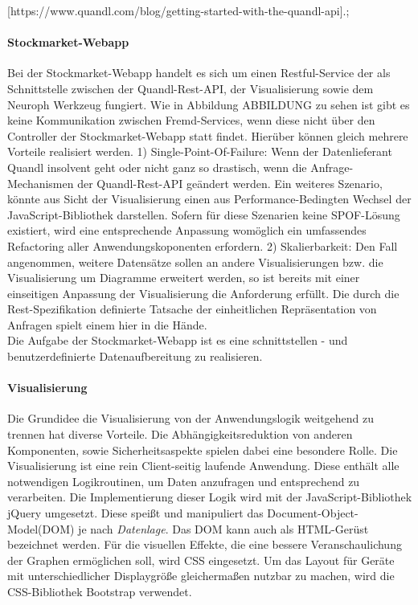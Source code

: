 [https://www.quandl.com/blog/getting-started-with-the-quandl-api].\linebreak;

\paragraph{Stockmarket-Webapp}
Bei der Stockmarket-Webapp handelt es sich um einen Restful-Service der als Schnittstelle zwischen der Quandl-Rest-API, der Visualisierung sowie dem Neuroph Werkzeug fungiert. Wie in Abbildung ABBILDUNG zu sehen ist gibt es keine Kommunikation zwischen Fremd-Services, wenn diese nicht über den Controller der Stockmarket-Webapp statt findet. Hierüber können gleich mehrere Vorteile realisiert werden. 
1) Single-Point-Of-Failure: Wenn der Datenlieferant Quandl insolvent geht oder nicht ganz so drastisch, wenn die Anfrage-Mechanismen der Quandl-Rest-API geändert werden. Ein weiteres Szenario, könnte aus Sicht der Visualisierung einen aus Performance-Bedingten Wechsel der JavaScript-Bibliothek darstellen. Sofern für diese Szenarien keine SPOF-Lösung existiert, wird eine entsprechende Anpassung womöglich ein umfassendes Refactoring aller Anwendungskoponenten erfordern. 
2) Skalierbarkeit: Den Fall angenommen, weitere Datensätze sollen an andere Visualisierungen bzw. die Visualisierung um Diagramme erweitert werden, so ist bereits mit einer einseitigen Anpassung der Visualisierung die Anforderung erfüllt. Die durch die Rest-Spezifikation definierte Tatsache der einheitlichen Repräsentation von Anfragen spielt einem hier in die Hände. \\
Die Aufgabe der Stockmarket-Webapp ist es eine schnittstellen - und benutzerdefinierte Datenaufbereitung zu realisieren. 

\paragraph{Visualisierung}
Die Grundidee die Visualisierung von der Anwendungslogik weitgehend zu trennen hat diverse Vorteile. Die Abhängigkeitsreduktion von anderen Komponenten, sowie Sicherheitsaspekte spielen dabei eine besondere Rolle. 
Die Visualisierung ist eine rein Client-seitig laufende Anwendung. Diese enthält alle notwendigen Logikroutinen, um Daten anzufragen und entsprechend zu verarbeiten. Die Implementierung dieser Logik wird mit der JavaScript-Bibliothek jQuery umgesetzt. Diese speißt und manipuliert das Document-Object-Model(DOM) je nach \emph{Datenlage}. Das DOM kann auch als HTML-Gerüst bezeichnet werden. Für die visuellen Effekte, die eine bessere Veranschaulichung der Graphen ermöglichen soll, wird CSS eingesetzt. Um das Layout für Geräte mit unterschiedlicher Displaygröße gleichermaßen nutzbar zu machen, wird die CSS-Bibliothek Bootstrap verwendet. 

